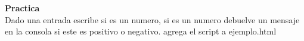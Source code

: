 {\textbf {\huge Practica}}
\\
Dado una entrada escribe si es un numero, si es un numero debuelve un mensaje en la consola si este es positivo o negativo. agrega el script a ejemplo.html



%
%
%
